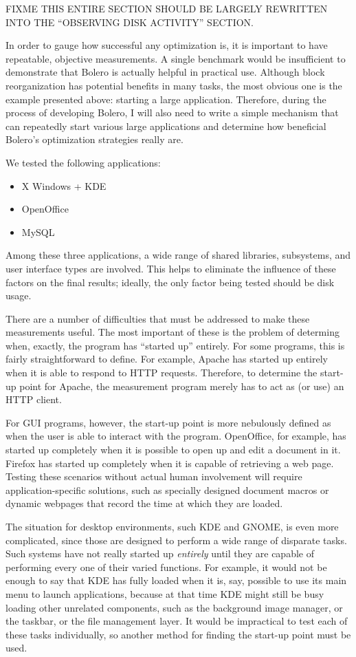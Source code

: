 \documentclass[10pt,twocolumn,letterpaper]{article}
\begin{document}
FIXME THIS ENTIRE SECTION SHOULD BE LARGELY REWRITTEN INTO THE ``OBSERVING DISK ACTIVITY'' SECTION.

In order to gauge how successful any optimization is, it is important to have
repeatable, objective measurements. A single benchmark would be insufficient to demonstrate
that Bolero is actually helpful in practical use. Although block reorganization has
potential benefits in many tasks, the most obvious one is the example presented above:
starting a large application. Therefore, during the process of developing Bolero, I will
also need to write a simple mechanism that can repeatedly start various large applications
and determine how beneficial Bolero's optimization strategies really are.

We tested the following applications:
\begin{itemize}
\item X Windows + KDE
\item OpenOffice
\item MySQL
\end{itemize}
Among these three applications, a wide range of shared libraries, subsystems, and user interface types
are involved. This helps to eliminate the influence of these factors on the final results;
ideally, the only factor being tested should be disk usage.

There are a number of difficulties that must be addressed to make these measurements useful.
The most important of these is the problem of determing when, exactly, the program has
``started up'' entirely. For some programs, this is fairly straightforward to define. For example,
Apache has started up entirely when it is able to respond to HTTP requests. Therefore,
to determine the start-up point for Apache, the measurement program merely has to act
as (or use) an HTTP client.

For GUI programs, however, the start-up point is more nebulously defined as when the user is
able to interact with the program. OpenOffice, for example, has started up completely when it is possible to open up and edit a document in it. Firefox has started up completely when it is capable of retrieving a web page. Testing these scenarios without actual human involvement will require application-specific solutions, such as
specially designed document macros or dynamic webpages that record the time at which they are loaded.

The situation for desktop environments, such KDE and GNOME, is even more complicated, since those are designed
to perform a wide range of disparate tasks. Such systems have not really started up \emph{entirely} until they are capable of performing every one of their varied functions. For example, it would not be enough to say that KDE has fully loaded when it is, say, possible to use its main menu to launch applications, because at that time KDE might still be busy loading other unrelated components, such as the background image manager, or the taskbar, or
the file management layer. It would be impractical to test each of these tasks individually,
so another method for finding the start-up point must be used.
\end{document}
